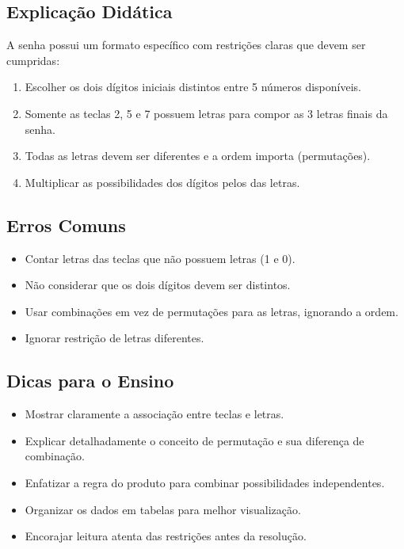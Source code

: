\documentclass{article}
\begin{document}
\subsection*{Explicação Didática}

A senha possui um formato específico com restrições claras que devem ser cumpridas:
\begin{enumerate}
\item Escolher os dois dígitos iniciais distintos entre 5 números disponíveis.
\item Somente as teclas 2, 5 e 7 possuem letras para compor as 3 letras finais da senha.
\item Todas as letras devem ser diferentes e a ordem importa (permutações).
\item Multiplicar as possibilidades dos dígitos pelos das letras.
\end{enumerate}

\subsection*{Erros Comuns}
\begin{itemize}
\item Contar letras das teclas que não possuem letras (1 e 0).
\item Não considerar que os dois dígitos devem ser distintos.
\item Usar combinações em vez de permutações para as letras, ignorando a ordem.
\item Ignorar restrição de letras diferentes.
\end{itemize}

\subsection*{Dicas para o Ensino}
\begin{itemize}
\item Mostrar claramente a associação entre teclas e letras.
\item Explicar detalhadamente o conceito de permutação e sua diferença de combinação.
\item Enfatizar a regra do produto para combinar possibilidades independentes.
\item Organizar os dados em tabelas para melhor visualização.
\item Encorajar leitura atenta das restrições antes da resolução.
\end{itemize}
\end{document}
